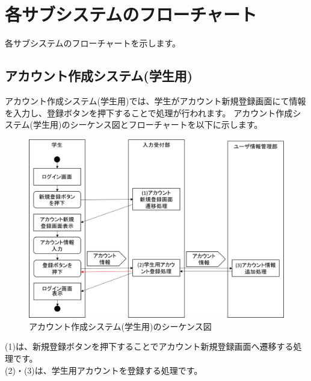 \section{各サブシステムのフローチャート}
各サブシステムのフローチャートを示します。

\subsection{アカウント作成システム(学生用)}
アカウント作成システム(学生用)では、学生がアカウント新規登録画面にて情報を入力し、登録ボタンを押下することで処理が行われます。
アカウント作成システム(学生用)のシーケンス図とフローチャートを以下に示します。

\begin{figure}[htbp]
  \begin{center}
    \includegraphics[width=1\linewidth,clip]{./img/seq1}
    \caption{アカウント作成システム(学生用)のシーケンス図}\label{fig:seq1}
  \end{center}
\end{figure}

(1)は、新規登録ボタンを押下することでアカウント新規登録画面へ遷移する処理です。\\
(2)・(3)は、学生用アカウントを登録する処理です。


